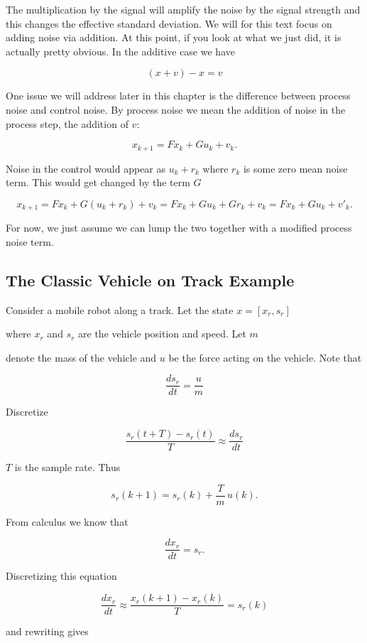 The multiplication by the signal will amplify the noise by the signal
strength and this changes the effective standard deviation. We will for
this text focus on adding noise via addition. At this point, if you look
at what we just did, it is actually pretty obvious. In the additive case
we have

\[(x + v) - x = v\]

One issue we will address later in this chapter is the difference
between process noise and control noise. By process noise we mean the
addition of noise in the process step, the addition of \(v\):

\[x_{k+1} = Fx_k + Gu_k + v_k .\]

Noise in the control would appear as \(u_k + r_k\) where \(r_k\) is some
zero mean noise term. This would get changed by the term \(G\)

\[x_{k+1} = Fx_k + G(u_k + r_k)  + v_k  = Fx_k + Gu_k + Gr_k  + v_k  = Fx_k + Gu_k + v'_k .\]

For now, we just assume we can lump the two together with a modified
process noise term.

\hypertarget{the-classic-vehicle-on-track-example}{%
\subsection{The Classic Vehicle on Track
Example}\label{the-classic-vehicle-on-track-example}}

Consider a mobile robot along a track. Let the state \(x = [x_r , s_r]\)

where \(x_r\) and \(s_r\) are the vehicle position and speed. Let \(m\)

denote the mass of the vehicle and \(u\) be the force acting on the
vehicle. Note that

\[\frac{ds_r}{dt} = \frac{u}{m}\]

Discretize

\[\frac{s_r(t+T)-s_r(t)}{T} \approx \frac{ds_r}{dt}\]

\(T\) is the sample rate. Thus

\[s_r(k+1) = s_r(k) + \frac{T}{m} \, u(k).\]

From calculus we know that

\[\frac{dx_r}{dt} = s_r.\]

Discretizing this equation

\[\frac{dx_r}{dt} \approx \frac{x_r(k+1) - x_r(k)}{T} =  s_r(k)\]

and rewriting gives

